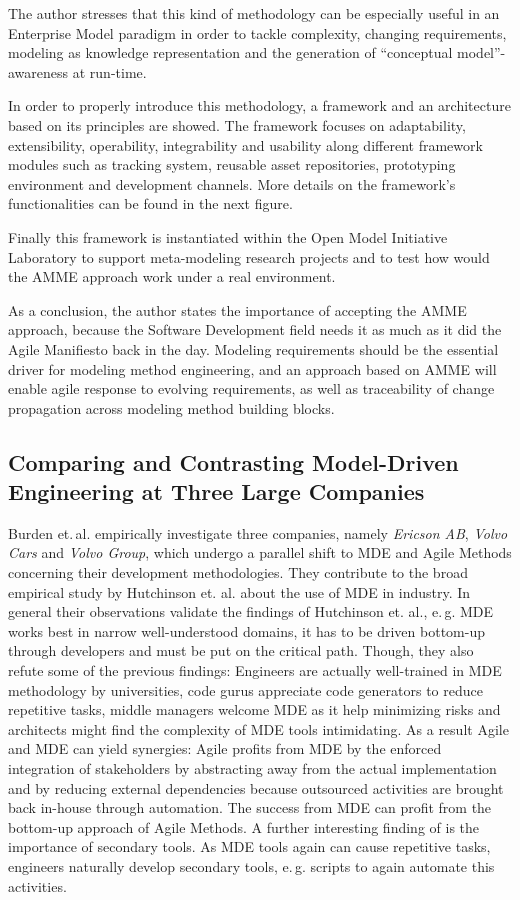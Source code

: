 \documentclass[10pt, a4paper, twocolumn]{article}
\begin{document}
The author stresses that this kind of methodology can be especially useful in an Enterprise Model paradigm in order to tackle complexity, changing requirements, modeling as knowledge representation and the generation of “conceptual model”-awareness at run-time.

In order to properly introduce this methodology, a framework and an architecture based on its principles are showed. The framework focuses on adaptability, extensibility, operability, integrability and usability along different framework modules such as tracking system, reusable asset repositories, prototyping environment and development channels. More details on the framework’s functionalities can be found in the next figure.

Finally this framework is instantiated within the Open Model Initiative Laboratory to support meta-modeling research projects and to test how would the AMME approach work under a real environment. 

As a conclusion, the author states the importance of accepting the AMME approach, because the Software Development field needs it as much as it did the Agile Manifiesto back in the day. Modeling
requirements should be the essential driver for modeling method engineering, and an approach based on AMME will enable agile response to evolving requirements, as well as traceability of change propagation across modeling method building blocks.

\subsection{Comparing and Contrasting Model-Driven Engineering at Three Large Companies}

Burden et.\,al. \cite{10} empirically investigate three companies, namely \emph{Ericson AB}, \emph{Volvo Cars} and \emph{Volvo Group}, which undergo a parallel shift to MDE and Agile Methods concerning their development methodologies.
They contribute to the broad empirical study by Hutchinson et. al. \cite{secondaryHutchinsonEmpirical} about the use of MDE in industry.
In general their observations validate the findings of Hutchinson et. al., e.\,g. MDE works best in narrow well-understood domains, it has to be driven bottom-up through developers and must be put on the critical path.
Though, they also refute some of the previous findings: 
Engineers are actually well-trained in MDE methodology by universities, code gurus appreciate code generators to reduce repetitive tasks, middle managers welcome MDE as it help minimizing risks and architects might find the complexity of MDE tools intimidating.
As a result Agile and MDE can yield synergies:
Agile profits from MDE by the enforced integration of stakeholders by abstracting away from the actual implementation and by reducing external dependencies because outsourced activities are brought back in-house through automation.
The success from MDE can profit from the bottom-up approach of Agile Methods.
A further interesting finding of \cite{10} is the importance of secondary tools. 
As MDE tools again can cause repetitive tasks, engineers naturally develop secondary tools, e.\,g. scripts to again automate this activities.
\end{document}
